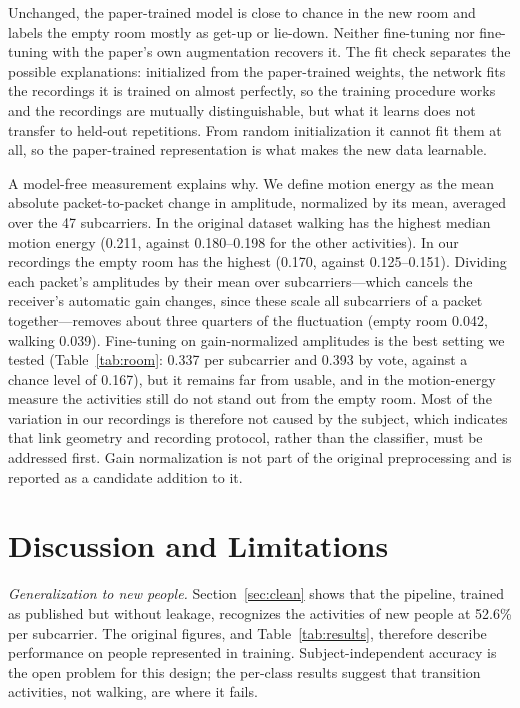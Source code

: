 \documentclass[journal]{IEEEtran}
\begin{document}
Unchanged, the paper-trained model is close to chance in the new room and labels
the empty room mostly as get-up or lie-down. Neither fine-tuning nor fine-tuning with
the paper's own augmentation recovers it. The fit check separates the possible
explanations: initialized from the paper-trained weights, the network fits the
recordings it is trained on almost perfectly, so the training procedure works and
the recordings are mutually distinguishable, but what it learns does not transfer to
held-out repetitions. From random initialization it cannot fit them at all, so the
paper-trained representation is what makes the new data learnable.

A model-free measurement explains why. We define motion energy as the mean absolute
packet-to-packet change in amplitude, normalized by its mean, averaged over the 47
subcarriers. In the original dataset walking has the highest median motion energy
(0.211, against 0.180--0.198 for the other activities). In our recordings the empty
room has the highest (0.170, against 0.125--0.151). Dividing each packet's amplitudes
by their mean over subcarriers---which cancels the receiver's automatic gain
changes, since these scale all subcarriers of a packet together---removes about
three quarters of the fluctuation (empty room 0.042, walking 0.039). Fine-tuning on
gain-normalized amplitudes is the best setting we tested (Table~\ref{tab:room}: 0.337
per subcarrier and 0.393 by vote, against a chance level of 0.167), but it remains far
from usable, and in the motion-energy measure the activities still do not stand out
from the empty room. Most of the variation in our recordings is therefore not caused
by the subject, which indicates that link geometry and recording protocol, rather
than the classifier, must be addressed first. Gain normalization is not part of the
original preprocessing and is reported as a candidate addition to it.

\section{Discussion and Limitations}
\label{sec:discussion}

\emph{Generalization to new people.} Section~\ref{sec:clean} shows that the
pipeline, trained as published but without leakage, recognizes the activities of new
people at 52.6\% per subcarrier. The original figures, and Table~\ref{tab:results},
therefore describe performance on people represented in training. Subject-independent
accuracy is the open problem for this design; the per-class results suggest that
transition activities, not walking, are where it fails.
\end{document}
